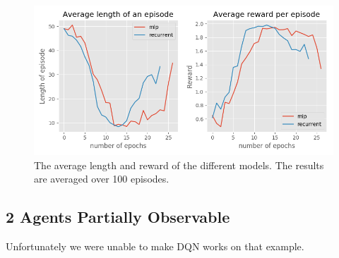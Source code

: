 \documentclass{article} %
\begin{document}
\begin{figure}[h]
\centering
\includegraphics[width=\textwidth]{multiagent_mdp_results.png}
\caption{The average length and reward of the different models. The results are averaged over 100 episodes.}
\end{figure}

\subsection{2 Agents Partially Observable}
Unfortunately we were unable to make DQN works on that example.

  

\end{document}
